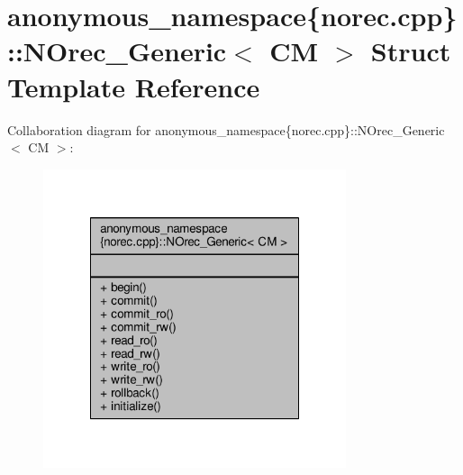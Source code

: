 \hypertarget{structanonymous__namespace_02norec_8cpp_03_1_1NOrec__Generic}{\section{anonymous\-\_\-namespace\{norec.\-cpp\}\-:\-:N\-Orec\-\_\-\-Generic$<$ C\-M $>$ Struct Template Reference}
\label{structanonymous__namespace_02norec_8cpp_03_1_1NOrec__Generic}
}


Collaboration diagram for anonymous\-\_\-namespace\{norec.\-cpp\}\-:\-:N\-Orec\-\_\-\-Generic$<$ C\-M $>$\-:
\nopagebreak
\begin{figure}[H]
\begin{center}
\leavevmode
\includegraphics[width=252pt]{structanonymous__namespace_02norec_8cpp_03_1_1NOrec__Generic__coll__graph}
\end{center}
\end{figure}
